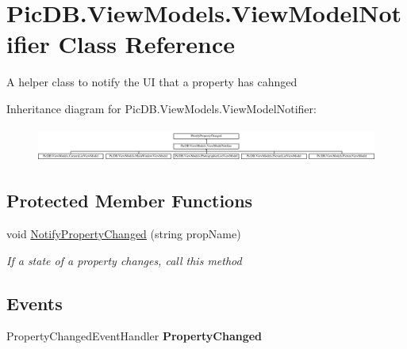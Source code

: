 \hypertarget{class_pic_d_b_1_1_view_models_1_1_view_model_notifier}{}\section{Pic\+D\+B.\+View\+Models.\+View\+Model\+Notifier Class Reference}
\label{class_pic_d_b_1_1_view_models_1_1_view_model_notifier}


A helper class to notify the UI that a property has cahnged  


Inheritance diagram for Pic\+D\+B.\+View\+Models.\+View\+Model\+Notifier\+:\begin{figure}[H]
\begin{center}
\leavevmode
\includegraphics[height=1.154639cm]{class_pic_d_b_1_1_view_models_1_1_view_model_notifier}
\end{center}
\end{figure}
\subsection*{Protected Member Functions}
\begin{DoxyCompactItemize}
\item 
void \mbox{\hyperlink{class_pic_d_b_1_1_view_models_1_1_view_model_notifier_a7a716e22d0ab10c338e2e792917d8299}{Notify\+Property\+Changed}} (string prop\+Name)
\begin{DoxyCompactList}\small\item\em If a state of a property changes, call this method \end{DoxyCompactList}\end{DoxyCompactItemize}
\subsection*{Events}
\begin{DoxyCompactItemize}
\item 
\mbox{\label{class_pic_d_b_1_1_view_models_1_1_view_model_notifier_a83218ea4582078da0a12e3afe4085e00}} 
Property\+Changed\+Event\+Handler {\bfseries Property\+Changed}
\end{DoxyCompactItemize}


